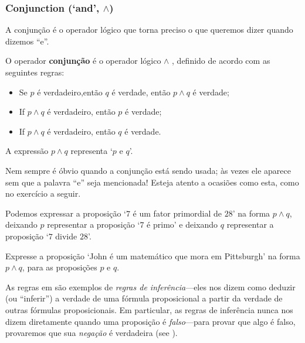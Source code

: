 \subsubsection*{Conjunction (`and', $\wedge$)}

A conjunção é o operador lógico que torna preciso o que queremos dizer quando dizemos “e”.
\begin{idefinition}
\label{defConjunction}
O operador \textbf{conjunção} é o operador lógico $\wedge$ , definido de acordo com as seguintes regras:
\begin{itemize}
\item \introrule{\wedge} Se $p$ é verdadeiro,então $q$ é verdade, então $p \wedge q$ é verdade;
\item {} If $p \wedge q$ é verdadeiro, então $p$ é verdade;
\item {} If $p \wedge q$ é verdadeiro, então $q$ é verdade.
\end{itemize}
A expressão $p \wedge q$ representa `$p$ e $q$'.
\end{idefinition}

Nem sempre é óbvio quando a conjunção está sendo usada; às vezes ele aparece sem que a palavra “e” seja mencionada! Esteja atento a ocasiões como esta, como no exercício a seguir.

\begin{example}
\label{exSevenDividesTwentyEightConjunction}
Podemos expressar a proposição `$7$ é um fator primordial de $28$' na forma $p \wedge q$, deixando $p$ representar a proposição `$7$ é primo' e deixando $q$ representar a proposição `$7$ divide $28$'.
\end{example}

\begin{exercise}
\label{exJohnMathematicianPittsburgh}

Expresse a proposição `John é um matemático que mora em Pittsburgh' na forma $p \wedge q$, para as proposições $p$ e $q$.\end{exercise}

As regras em  são exemplos de \textit{regras de inferência}---eles nos dizem como deduzir (ou “inferir”) a verdade de uma fórmula proposicional a partir da verdade de outras fórmulas proposicionais. Em particular, as regras de inferência nunca nos dizem diretamente quando uma proposição é \textit{falso}---para provar que algo é falso, provaremos que sua \textit{negação} é verdadeira (see ).

